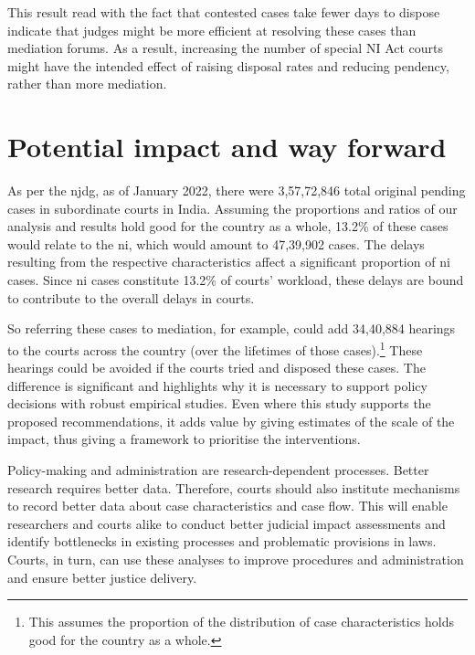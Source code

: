 \documentclass[11pt,a4paper]{article}
\begin{document}
This result read with the fact that contested cases take fewer days to dispose indicate that judges might be more efficient at resolving these cases than mediation forums. As a result, increasing the number of special NI Act courts might have the intended effect of raising disposal rates and reducing pendency, rather than more mediation.

\section{Potential impact and way forward} \label{sec:impact-case-loads}

As per the \gls{njdg}, as of January 2022, there were 3,57,72,846 total original pending cases in subordinate courts in India. Assuming the proportions and ratios of our analysis and results hold good for the country as a whole, 13.2\% of these cases would relate to the \gls{ni}, which would amount to 47,39,902 cases. The delays resulting from the respective characteristics affect a significant proportion of \gls{ni} cases. Since \gls{ni} cases constitute 13.2\% of courts' workload, these delays are bound to contribute to the overall delays in courts.

So referring these cases to mediation, for example, could add 34,40,884 hearings to the courts across the country (over the lifetimes of those cases).\footnote{This assumes the proportion of the distribution of case characteristics holds good for the country as a whole.} These hearings could be avoided if the courts tried and disposed these cases. The difference is significant and highlights why it is necessary to support policy decisions with robust empirical studies. Even where this study supports the proposed recommendations, it adds value by giving estimates of the scale of the impact, thus giving a framework to prioritise the interventions.

Policy-making and administration are research-dependent processes. Better research requires better data. Therefore, courts should also institute mechanisms to record better data about case characteristics and case flow. This will enable researchers and courts alike to conduct better judicial impact assessments and identify bottlenecks in existing processes and problematic provisions in laws. Courts, in turn, can use these analyses to improve procedures and administration and ensure better justice delivery.
\end{document}
